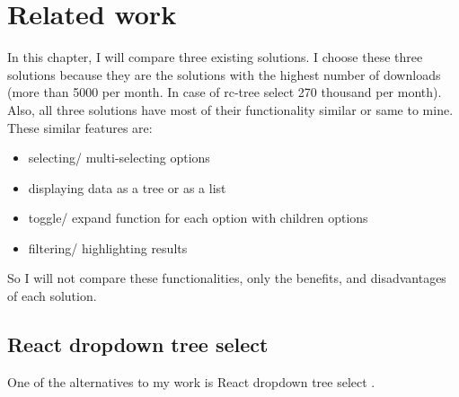 
\chapter{Related work} %
\label{Chapter3} %


In this chapter, I will compare three existing solutions. I choose these three solutions because they are the solutions with the highest number of downloads (more than 5000 per month. In case of rc-tree select 270 thousand per month). Also, all three solutions have most of their functionality similar or same to mine. These similar features are:
\begin{itemize}
\item selecting/ multi-selecting options
\item displaying data as a tree or as a list
\item toggle/ expand function for each option with children options
\item filtering/ highlighting results
\end{itemize}

So I will not compare these functionalities, only the benefits, and disadvantages of each solution.


\section{React dropdown tree select}

One of the alternatives to my work is React dropdown tree select \parencite{react-dropdown-tree-select}.
  
